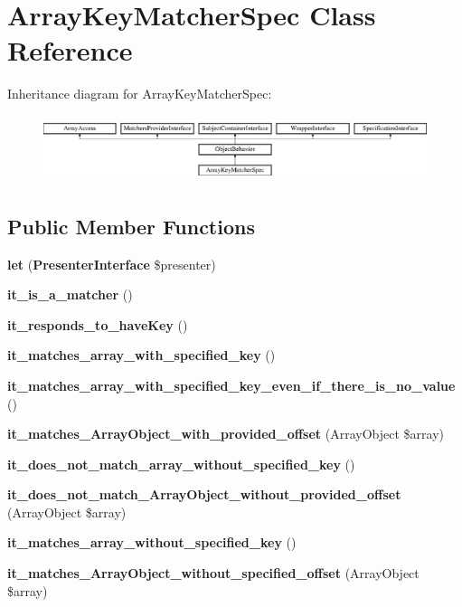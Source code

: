 \section{Array\+Key\+Matcher\+Spec Class Reference}
\label{classspec_1_1_php_spec_1_1_matcher_1_1_array_key_matcher_spec}
Inheritance diagram for Array\+Key\+Matcher\+Spec\+:\begin{figure}[H]
\begin{center}
\leavevmode
\includegraphics[height=1.953488cm]{classspec_1_1_php_spec_1_1_matcher_1_1_array_key_matcher_spec}
\end{center}
\end{figure}
\subsection*{Public Member Functions}
\begin{DoxyCompactItemize}
\item 
{\bf let} ({\bf Presenter\+Interface} \$presenter)
\item 
{\bf it\+\_\+is\+\_\+a\+\_\+matcher} ()
\item 
{\bf it\+\_\+responds\+\_\+to\+\_\+have\+Key} ()
\item 
{\bf it\+\_\+matches\+\_\+array\+\_\+with\+\_\+specified\+\_\+key} ()
\item 
{\bf it\+\_\+matches\+\_\+array\+\_\+with\+\_\+specified\+\_\+key\+\_\+even\+\_\+if\+\_\+there\+\_\+is\+\_\+no\+\_\+value} ()
\item 
{\bf it\+\_\+matches\+\_\+\+Array\+Object\+\_\+with\+\_\+provided\+\_\+offset} (Array\+Object \$array)
\item 
{\bf it\+\_\+does\+\_\+not\+\_\+match\+\_\+array\+\_\+without\+\_\+specified\+\_\+key} ()
\item 
{\bf it\+\_\+does\+\_\+not\+\_\+match\+\_\+\+Array\+Object\+\_\+without\+\_\+provided\+\_\+offset} (Array\+Object \$array)
\item 
{\bf it\+\_\+matches\+\_\+array\+\_\+without\+\_\+specified\+\_\+key} ()
\item 
{\bf it\+\_\+matches\+\_\+\+Array\+Object\+\_\+without\+\_\+specified\+\_\+offset} (Array\+Object \$array)
\end{DoxyCompactItemize}
